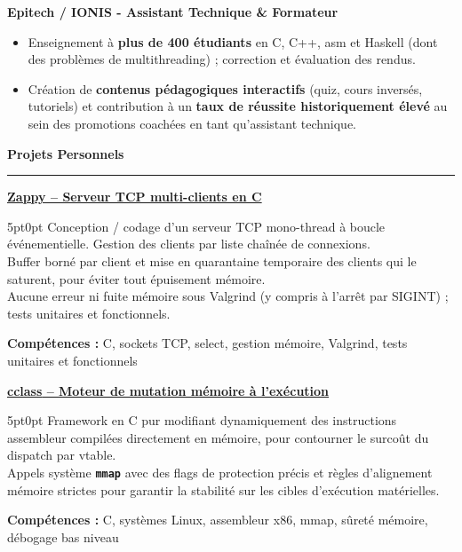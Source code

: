 \documentclass[9pt]{extarticle}
\begin{document}
\par\vspace{5pt}

{\bfseries Epitech / IONIS - Assistant Technique \& Formateur}
\begin{itemize}[noitemsep, topsep=0pt]
	\item Enseignement à {\bfseries plus de 400 étudiants} en C, C++, asm et Haskell (dont des problèmes de multithreading) ; correction et évaluation des rendus.
	\item Création de {\bfseries contenus pédagogiques interactifs} (quiz, cours inversés, tutoriels) et contribution à un {\bfseries taux de réussite historiquement élevé} au sein des promotions coachées en tant qu'assistant technique.
\end{itemize}

\par\vspace{5pt}

{\large\bfseries Projets Personnels}
\par\vspace{-8pt}
\rule{\linewidth}{0.4pt}
\par\vspace{5pt}

\underline{\bfseries Zappy -- Serveur TCP multi-clients en C}
\par
\begin{adjustwidth}{5pt}{0pt}
    Conception / codage d'un serveur TCP mono-thread à boucle événementielle. Gestion des clients par liste chaînée de connexions. \\
    Buffer borné par client et mise en quarantaine temporaire des clients qui le saturent, pour éviter tout épuisement mémoire. \\
    Aucune erreur ni fuite mémoire sous Valgrind (y compris à l'arrêt par SIGINT) ; tests unitaires et fonctionnels.
\end{adjustwidth}
\par
{\bfseries Compétences :} C, sockets TCP, select, gestion mémoire, Valgrind, tests unitaires et fonctionnels

\par\vspace{8pt}

\underline{\bfseries \href{https://github.com/paulogarithm/cclass}{cclass} -- Moteur de mutation mémoire à l'exécution}
\par
\begin{adjustwidth}{5pt}{0pt}
    Framework en C pur modifiant dynamiquement des instructions assembleur compilées directement en mémoire, pour contourner le surcoût du dispatch par vtable. \\
    Appels système {\bfseries \texttt{mmap}} avec des flags de protection précis et règles d'alignement mémoire strictes pour garantir la stabilité sur les cibles d'exécution matérielles.
\end{adjustwidth}
\par
{\bfseries Compétences :} C, systèmes Linux, assembleur x86, mmap, sûreté mémoire, débogage bas niveau
\end{document}
